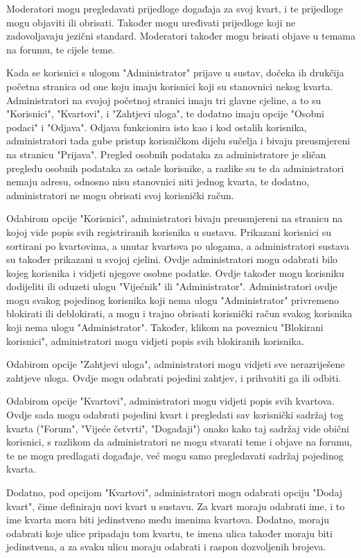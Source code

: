 	Moderatori mogu pregledavati prijedloge događaja za svoj kvart, i te prijedloge mogu objaviti ili obrisati. Također mogu uređivati prijedloge koji ne zadovoljavaju jezični standard. Moderatori također mogu brisati objave u temama na forumu, te cijele teme.
	
	Kada se korisnici s ulogom "Administrator" prijave u sustav, dočeka ih drukčija početna stranica od one koju imaju korisnici koji su stanovnici nekog kvarta. Administratori na svojoj početnoj stranici imaju tri glavne cjeline, a to su "Korisnici", "Kvartovi", i "Zahtjevi uloga", te dodatno imaju opcije "Osobni podaci" i "Odjava". Odjava funkcionira isto kao i kod ostalih korisnika, administratori tada gube pristup korisničkom dijelu sučelja i bivaju preusmjereni na stranicu "Prijava". Pregled osobnih podataka za administratore je sličan pregledu osobnih podataka za ostale korisnike, a razlike su te da administratori nemaju adresu, odnosno nisu stanovnici niti jednog kvarta, te dodatno, administratori ne mogu obrisati svoj korisnički račun.
	
	Odabirom opcije "Korisnici", administratori bivaju preusmjereni na stranicu na kojoj vide popis svih registriranih korisnika u sustavu. Prikazani korisnici su sortirani po kvartovima, a unutar kvartova po ulogama, a administratori sustava su također prikazani u svojoj cjelini. Ovdje administratori mogu odabrati bilo kojeg korisnika i vidjeti njegove osobne podatke. Ovdje također mogu korisniku dodijeliti ili oduzeti ulogu "Vijećnik" ili "Administrator". Administratori ovdje mogu svakog pojedinog korisnika koji nema ulogu "Administrator" privremeno blokirati ili deblokirati, a mogu i trajno obrisati korisnički račun svakog korisnika koji nema ulogu "Administrator". Također, klikom na poveznicu "Blokirani korisnici", administratori mogu vidjeti popis svih blokiranih korisnika.
	
	Odabirom opcije "Zahtjevi uloga", administratori mogu vidjeti sve nerazriješene zahtjeve uloga. Ovdje mogu odabrati pojedini zahtjev, i prihvatiti ga ili odbiti. 
	
	Odabirom opcije "Kvartovi", administratori mogu vidjeti popis svih kvartova. Ovdje sada mogu odabrati pojedini kvart i pregledati sav korisnički sadržaj tog kvarta ("Forum", "Vijeće četvrti", "Događaji") onako kako taj sadržaj vide obični korisnici, s razlikom da administratori ne mogu stvarati teme i objave na forumu, te ne mogu predlagati događaje, već mogu samo pregledavati sadržaj pojedinog kvarta.
	
	Dodatno, pod opcijom "Kvartovi", administratori mogu odabrati opciju "Dodaj kvart", čime definiraju novi kvart u sustavu. Za kvart moraju odabrati ime, i to ime kvarta mora biti jedinstveno među imenima kvartova. Dodatno, moraju odabrati koje ulice pripadaju tom kvartu, te imena ulica također moraju biti jedinstvena, a za svaku ulicu moraju odabrati i raspon dozvoljenih brojeva.
	
